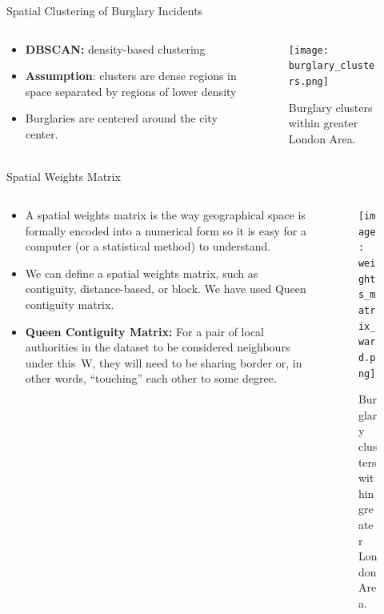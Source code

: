 \documentclass[10pt, aspectratio=169]{beamer}
\begin{document}
\begin{frame}{Spatial Clustering of Burglary Incidents}
    \begin{columns}
        \begin{column}{0.5\textwidth}
            \begin{itemize}
                \item \textbf{DBSCAN:} density-based clustering
                \item \textbf{Assumption}: clusters are dense regions in space separated by regions of lower density
                \item Burglaries are centered around the city center.
            \end{itemize}
        \end{column}
        \begin{column}{0.5\textwidth}
            \begin{figure}
            \centering
                \texttt{[image: burglary\_clusters.png]}
                \caption{Burglary clusters within greater London Area.}
            \end{figure}
        \end{column}
    \end{columns}
\end{frame}

\begin{frame}{Spatial Weights Matrix}
    \begin{columns}
        \begin{column}{0.5\textwidth}
            \begin{itemize}
                \item A spatial weights matrix is the way geographical space is formally encoded into 
                a numerical form so it is easy for a computer (or a statistical method) to understand.
                \item We can define a spatial weights matrix, such as contiguity, distance-based, 
                or block. We have used Queen contiguity matrix. 
                \item \textbf{Queen Contiguity Matrix:} For a pair of local authorities in the dataset to be 
                considered neighbours under this W, they will need to be sharing border or, in other words, “touching” each other to some degree. 

            \end{itemize}
        \end{column}
        \begin{column}{0.5\textwidth}
            \begin{figure}
            \centering
                \texttt{[image: weights\_matrix\_ward.png]}
                \caption{Burglary clusters within greater London Area.}
            \end{figure}
        \end{column}
    \end{columns}
\end{frame}
\end{document}
